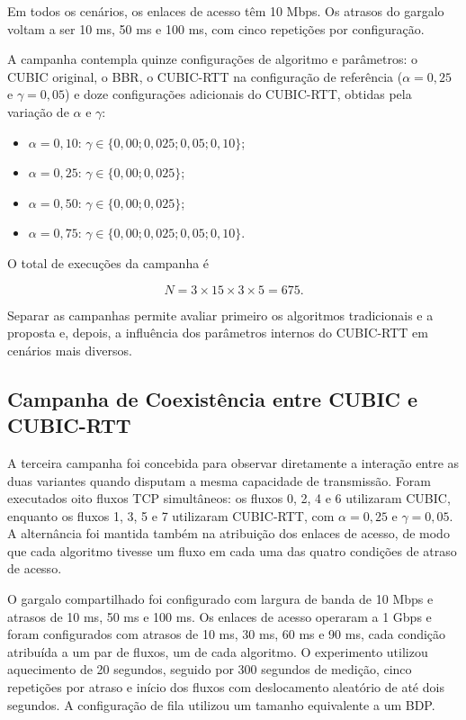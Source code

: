 Em todos os cenários, os enlaces de acesso têm 10 Mbps. Os atrasos do gargalo voltam a ser 10 ms, 50 ms e 100 ms, com cinco repetições por configuração.

A campanha contempla quinze configurações de algoritmo e parâmetros: o CUBIC original, o BBR, o CUBIC-RTT na configuração de referência ($\alpha=0{,}25$ e $\gamma=0{,}05$) e doze configurações adicionais do CUBIC-RTT, obtidas pela variação de $\alpha$ e $\gamma$:

\begin{itemize}
    \item $\alpha=0{,}10$: $\gamma \in \{0{,}00; 0{,}025; 0{,}05; 0{,}10\}$;
    \item $\alpha=0{,}25$: $\gamma \in \{0{,}00; 0{,}025\}$;
    \item $\alpha=0{,}50$: $\gamma \in \{0{,}00; 0{,}025\}$;
    \item $\alpha=0{,}75$: $\gamma \in \{0{,}00; 0{,}025; 0{,}05; 0{,}10\}$.
\end{itemize}

O total de execuções da campanha é

\begin{equation}
N = 3 \times 15 \times 3 \times 5 = 675.
\end{equation}

Separar as campanhas permite avaliar primeiro os algoritmos tradicionais e a proposta e, depois, a influência dos parâmetros internos do CUBIC-RTT em cenários mais diversos.

\subsection{Campanha de Coexistência entre CUBIC e CUBIC-RTT}

A terceira campanha foi concebida para observar diretamente a interação entre as duas variantes quando disputam a mesma capacidade de transmissão. Foram executados oito fluxos TCP simultâneos: os fluxos 0, 2, 4 e 6 utilizaram CUBIC, enquanto os fluxos 1, 3, 5 e 7 utilizaram CUBIC-RTT, com $\alpha=0{,}25$ e $\gamma=0{,}05$. A alternância foi mantida também na atribuição dos enlaces de acesso, de modo que cada algoritmo tivesse um fluxo em cada uma das quatro condições de atraso de acesso.

O gargalo compartilhado foi configurado com largura de banda de 10 Mbps e atrasos de 10 ms, 50 ms e 100 ms. Os enlaces de acesso operaram a 1 Gbps e foram configurados com atrasos de 10 ms, 30 ms, 60 ms e 90 ms, cada condição atribuída a um par de fluxos, um de cada algoritmo. O experimento utilizou aquecimento de 20 segundos, seguido por 300 segundos de medição, cinco repetições por atraso e início dos fluxos com deslocamento aleatório de até dois segundos. A configuração de fila utilizou um tamanho equivalente a um BDP.

